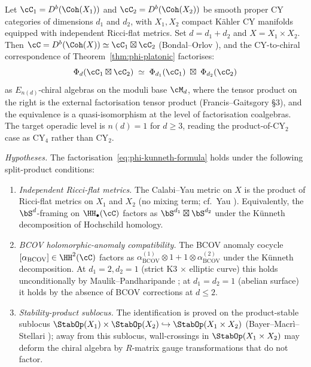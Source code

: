 \begin{proposition}
\label{prop:phi-d-kunneth-split-product}
Let $\cC_1 = D^b(\Coh(X_1))$ and $\cC_2 = D^b(\Coh(X_2))$ be smooth proper CY categories of dimensions $d_1$ and $d_2$, with $X_1, X_2$ compact K\"ahler CY manifolds equipped with independent Ricci-flat metrics. Set $d = d_1 + d_2$ and $X = X_1 \times X_2$. Then $\cC = D^b(\Coh(X)) \simeq \cC_1 \boxtimes \cC_2$ \textup{(}Bondal--Orlov \cite{BondalOrlov2003}\textup{),} and the CY-to-chiral correspondence of Theorem~\textup{\ref{thm:phi-platonic}} factorises:
\begin{equation}\label{eq:phi-kunneth-formula}
 \Phi_{d}(\cC_1 \boxtimes \cC_2) \;\simeq\; \Phi_{d_1}(\cC_1) \;\boxtimes\; \Phi_{d_2}(\cC_2)
\end{equation}
as $E_{n(d)}$-chiral algebras on the moduli base $\cM_d$, where the tensor product on the right is the external factorisation tensor product \textup{(}Francis--Gaitsgory \cite{FrancisGaitsgory2012} \S 3\textup{),} and the equivalence is a quasi-isomorphism at the level of factorisation coalgebras. The target operadic level is $n(d) = 1$ for $d \ge 3$, reading the product-of-CY$_2$ case as CY$_4$ rather than CY$_2$.

\textit{Hypotheses.} The factorisation~\eqref{eq:phi-kunneth-formula} holds under the following split-product conditions:
\begin{enumerate}[label=\textup{(K\arabic*)}]
\item\label{kunneth:H1} \emph{Independent Ricci-flat metrics.} The Calabi--Yau metric on $X$ is the product of Ricci-flat metrics on $X_1$ and $X_2$ \textup{(}no mixing term; cf.\ Yau \cite{Yau1978}\textup{).} Equivalently, the $\bS^d$-framing on $\HH_\bullet(\cC)$ factors as $\bS^{d_1} \boxtimes \bS^{d_2}$ under the K\"unneth decomposition of Hochschild homology.
\item\label{kunneth:H2} \emph{BCOV holomorphic-anomaly compatibility.} The BCOV anomaly cocycle $[\alpha_{\mathrm{BCOV}}] \in \HH^2(\cC)$ factors as $\alpha^{(1)}_{\mathrm{BCOV}} \otimes 1 + 1 \otimes \alpha^{(2)}_{\mathrm{BCOV}}$ under the K\"unneth decomposition. At $d_1 = 2, d_2 = 1$ \textup{(}strict K3 $\times$ elliptic curve\textup{)} this holds unconditionally by Maulik--Pandharipande \cite{MaulikPandharipande2013}; at $d_1 = d_2 = 1$ \textup{(}abelian surface\textup{)} it holds by the absence of BCOV corrections at $d \le 2$.
\item\label{kunneth:H3} \emph{Stability-product sublocus.} The identification is proved on the product-stable sublocus $\StabOp(X_1) \times \StabOp(X_2) \hookrightarrow \StabOp(X_1 \times X_2)$ \textup{(}Bayer--Macr\`i--Stellari \cite{BayerMacriStellari2016}\textup{);} away from this sublocus, wall-crossings in $\StabOp(X_1 \times X_2)$ may deform the chiral algebra by $R$-matrix gauge transformations that do not factor.
\end{enumerate}


\end{proposition}
